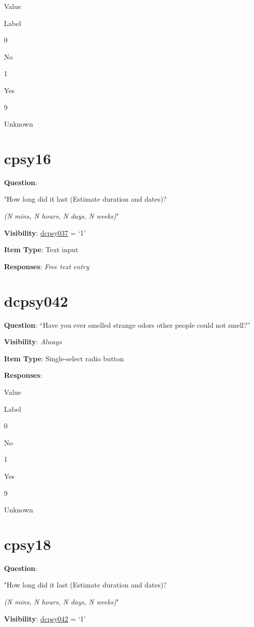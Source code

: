 \documentclass[]{book}
\begin{document}
Value

Label

0

No

1

Yes

9

Unknown

\hypertarget{cpsy16}{%
\section{cpsy16}\label{cpsy16}}

\textbf{Question}:

"How long did it last (Estimate duration and dates)?

\emph{(N mins, N hours, N days, N weeks)}"

\textbf{Visibility}: \protect\hyperlink{dcpsy037}{dcpsy037} = `1'

\textbf{Item Type}: Text input

\textbf{Responses}: \emph{Free text entry}

\hypertarget{dcpsy042}{%
\section{dcpsy042}\label{dcpsy042}}

\textbf{Question}: ``Have you ever smelled strange odors other people could not smell?''

\textbf{Visibility}: \emph{Always}

\textbf{Item Type}: Single-select radio button

\textbf{Responses}:

Value

Label

0

No

1

Yes

9

Unknown

\hypertarget{cpsy18}{%
\section{cpsy18}\label{cpsy18}}

\textbf{Question}:

"How long did it last (Estimate duration and dates)?

\emph{(N mins, N hours, N days, N weeks)}"

\textbf{Visibility}: \protect\hyperlink{dcpsy042}{dcpsy042} = `1'
\end{document}
